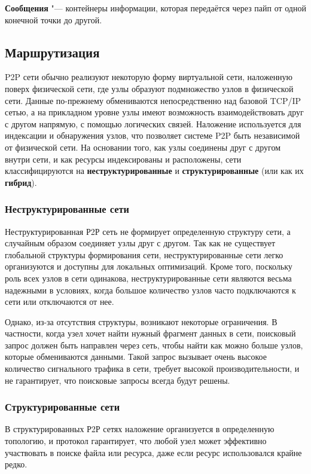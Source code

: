 \documentclass[bachelor, och, coursework]{SCWorks}
\begin{document}
\textbf{Сообщения} "--- контейнеры информации, которая передаётся через пайп от одной конечной точки до другой.

\subsection{Маршрутизация}
P2P сети обычно реализуют некоторую форму виртуальной сети, наложенную поверх физической сети, где узлы образуют подмножество узлов в физической сети. Данные по-прежнему обмениваются непосредственно над базовой TCP/IP сетью, а на прикладном уровне узлы имеют возможность взаимодействовать друг с другом напрямую, с помощью логических связей. Наложение используется для индексации и обнаружения узлов, что позволяет системе P2P быть независимой от физической сети. На основании того, как узлы соединены друг с другом внутри сети, и как ресурсы индексированы и расположены, сети классифицируются на \textbf{неструктурированные} и \textbf{структурированные} (или как их \textbf{гибрид}).

\subsubsection{Неструктурированные сети}
Неструктурированная Р2Р сеть не формирует определенную структуру сети, а случайным образом соединяет узлы друг с другом. Так как не существует глобальной структуры формирования сети, неструктурированные сети легко организуются и доступны для локальных оптимизаций. Кроме того, поскольку роль всех узлов в сети одинакова, неструктурированные сети являются весьма надежными в условиях, когда большое количество узлов часто подключаются к сети или отключаются от нее.

Однако, из-за отсутствия структуры, возникают некоторые ограничения. В частности, когда узел хочет найти нужный фрагмент данных в сети, поисковый запрос должен быть направлен через сеть, чтобы найти как можно больше узлов, которые обмениваются данными. Такой запрос вызывает очень высокое количество сигнального трафика в сети, требует высокой производительности, и не гарантирует, что поисковые запросы всегда будут решены.

\subsubsection{Структурированные сети}
В структурированных Р2Р сетях наложение организуется в определенную топологию, и протокол гарантирует, что любой узел может эффективно участвовать в поиске файла или ресурса, даже если ресурс использовался крайне редко.
\end{document}
